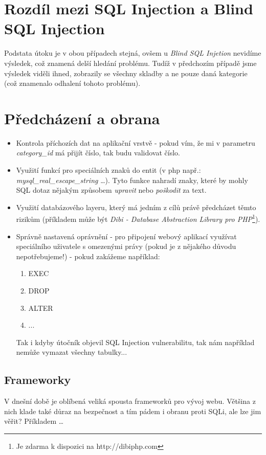 \documentclass[12pt, a4paper]{report}
\begin{document}
\section{Rozdíl mezi SQL Injection a Blind SQL Injection}
Podstata útoku je v obou případech stejná, ovšem u \textit{Blind SQL Injetion} nevidíme výsledek, což znamená delší hledání problému. Tudíž v předchozím případě jsme výsledek viděli ihned, zobrazily se všechny skladby a ne pouze daná kategorie (což znamenalo odhalení tohoto problému). 

\section{Předcházení a obrana}
\begin{itemize}
\item Kontrola příchozích dat na aplikační vrstvě - pokud vím, že mi v parametru \textit{category\_id} má přijít číslo, tak budu validovat číslo.
\item Využití funkcí pro  speciálních znaků do entit (v php např.: \textit{mysql\_real\_escape\_string} \ldots). Tyto funkce nahradí znaky, které by mohly SQL dotaz nějakým způsobem \textit{upravit} nebo \textit{poškodit} za text.
\item Využití databázového layeru, který má jedním z cílů právě předcházet těmto rizikům (příkladem může být \textit{Dibi - Database Abstraction Library pro PHP}\footnote{Je zdarma k dispozici na http://dibiphp.com}).
\item Správně nastavená oprávnění - pro připojení webový aplikací využívat speciálního uživatele s omezenými právy (pokud je z nějakého důvodu nepotřebujeme!) - pokud zakážeme například:
\begin{enumerate}
\item EXEC
\item DROP
\item ALTER
\item ...
\end{enumerate}
Tak i kdyby útočník objevil SQL Injection vulnerabilitu, tak nám například nemůže vymazat všechny tabulky...
\end{itemize}
\subsection{Frameworky}
V dnešní době je oblíbená veliká spousta frameworků pro vývoj webu. Většina z nich klade také důraz na bezpečnost a tím pádem i obranu proti SQLi, ale lze jim věřit? Příkladem \ldots
\end{document}

